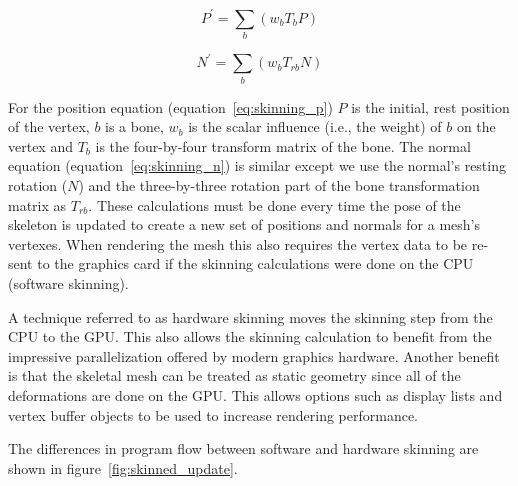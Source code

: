 \begin{equation}
 \label{eq:skinning_p}
  P^\prime = \sum_b{\left(w_bT_bP\right)}
\end{equation}

\begin{equation}
 \label{eq:skinning_n}
 N^\prime = \sum_b{\left(w_bT_{rb}N\right)}
\end{equation}

For the position equation (equation~\ref{eq:skinning_p}) $P$ is the initial, rest position of the vertex, $b$ is a bone, $w_b$ is the scalar influence (i.e., the weight) of $b$ on the vertex and $T_b$ is the four-by-four transform matrix of the bone.
The normal equation (equation~\ref{eq:skinning_n}) is similar except we use the normal's resting rotation ($N$) and the three-by-three rotation part of the bone transformation matrix as $T_{rb}$.
These calculations must be done every time the pose of the skeleton is updated to create a new set of positions and normals for a mesh's vertexes.
When rendering the mesh this also requires the vertex data to be re-sent to the graphics card if the skinning calculations were done on the CPU (software skinning).


A technique referred to as hardware skinning moves the skinning step from the CPU to the GPU.
This also allows the skinning calculation to benefit from the impressive parallelization offered by modern graphics hardware.
Another benefit is that the skeletal mesh can be treated as static geometry since all of the deformations are done on the GPU.
This allows options such as display lists and vertex buffer objects\cite{ARB_texture_buffer_object} to be used to increase rendering performance.

The differences in program flow between software and hardware skinning are shown in figure~\ref{fig:skinned_update}.



